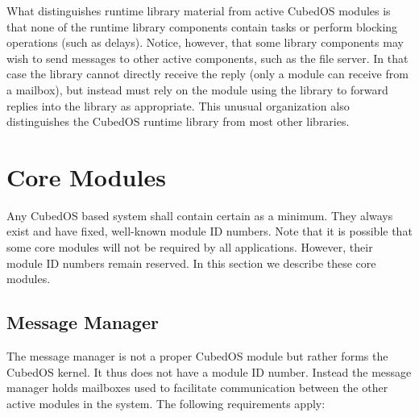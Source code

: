 What distinguishes runtime library material from active CubedOS modules is that none of the
runtime library components contain tasks or perform blocking operations (such as delays).
Notice, however, that some library components may wish to send messages to other active
components, such as the file server. In that case the library cannot directly receive the reply
(only a module can receive from a mailbox), but instead must rely on the module using the
library to forward replies into the library as appropriate. This unusual organization also
distinguishes the CubedOS runtime library from most other libraries. 

\section{Core Modules}
\label{sec:core-modules}

Any CubedOS based system shall contain certain  as a minimum. They always
exist and have fixed, well-known module ID numbers. Note that it is possible that some core
modules will not be required by all applications. However, their module ID numbers remain
reserved.  In this section we describe these core modules.

\subsection{Message Manager}
\label{sec:message-manager}

The message manager is not a proper CubedOS module but rather forms the CubedOS kernel. It thus
does not have a module ID number. Instead the message manager holds mailboxes used to facilitate
communication between the other active modules in the system. The following requirements apply:


